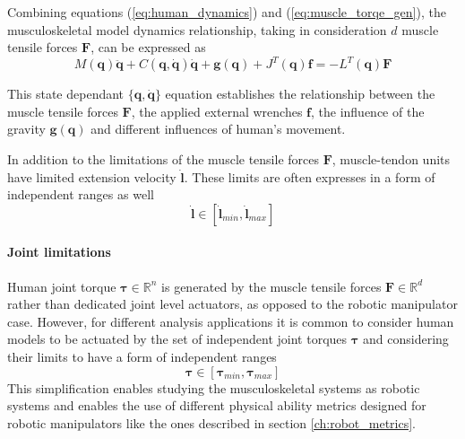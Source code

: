 Combining equations (\ref{eq:human_dynamics}) and (\ref{eq:muscle_torqe_gen}), the musculoskeletal model dynamics relationship, taking in consideration $d$ muscle tensile forces $\bm{F}$, can be expressed as
\begin{equation}
    M(\bm{q})\ddot{\bm{q}} + C(\bm{q},\dot{\bm{q}})\dot{\bm{q}} + \bm{g}(\bm{q}) + J^{T}(\bm{q})\bm{f}  = -L^{T}(\bm{q})\bm{F} 
    \label{eq:human_dyn_all}
\end{equation}

This state dependant $\{\bm{q},\dot{\bm{q}}\}$ equation establishes the relationship between the muscle tensile forces $\bm{F}$, the applied external wrenches $\bm{f}$, the influence of the gravity $\bm{g}(\bm{q})$ and different influences of human's movement. 


In addition to the limitations of the muscle tensile forces $\bm{F}$, muscle-tendon units have limited extension velocity $\dot{\bm{l}}$. These limits are often expresses in a form of independent ranges as well
\begin{equation}
    \dot{\bm{l}} \in  [\dot{\bm{l}}_{min}, \dot{\bm{l}}_{max} ]
    \label{eq:human_vel_lim}
\end{equation}

\paragraph{Joint limitations} Human joint torque $\bm{\tau}\in\mathbb{R}^n$ is generated by the muscle tensile forces $\bm{F}\in \mathbb{R}^d$ rather than dedicated joint level actuators, as opposed to the robotic manipulator case. However, for different analysis applications it is common to consider human models to be actuated by the set of independent joint torques $\bm{\tau}$ and considering their limits to have a form of independent ranges \cite{HOLZBAUR20072442}
\begin{equation}
    \bm{\tau} \in [\bm{\tau}_{min},\bm{\tau}_{max}]
    \label{eq:human_torque_lim}
\end{equation}
This simplification enables studying the musculoskeletal systems as robotic systems and enables the use of different physical ability metrics designed for robotic manipulators like the ones described in section \ref{ch:robot_metrics}. 

